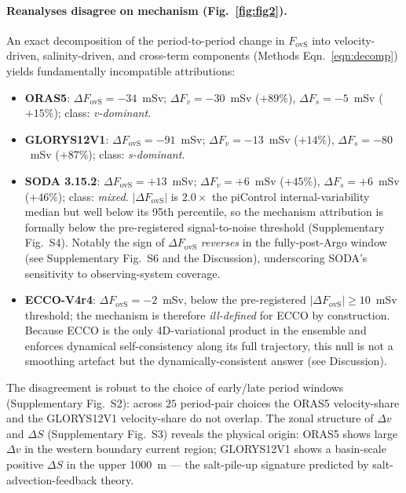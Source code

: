 \documentclass[12pt,a4paper]{article}
\newcommand{\Fovs}{F_\mathrm{ovS}}
\newcommand{\dFv}{\Delta F_v}
\newcommand{\dFs}{\Delta F_s}
\begin{document}
\paragraph{Reanalyses disagree on mechanism (Fig.~\ref{fig:fig2}).}
An exact decomposition of the period-to-period change in $\Fovs$ into
velocity-driven, salinity-driven, and cross-term components
(Methods Eqn.~\ref{eqn:decomp}) yields fundamentally incompatible
attributions:
\begin{itemize}
\item \textbf{ORAS5}: $\Delta\Fovs = -34$~mSv; $\dFv = -30$~mSv
      (${+89\%}$), $\dFs = -5$~mSv (${+15\%}$); class:
      \emph{v-dominant}.
\item \textbf{GLORYS12V1}: $\Delta\Fovs = -91$~mSv; $\dFv = -13$~mSv
      (${+14\%}$), $\dFs = -80$~mSv (${+87\%}$); class:
      \emph{s-dominant}.
\item \textbf{SODA 3.15.2}: $\Delta\Fovs = +13$~mSv;
      $\dFv = +6$~mSv (${+45\%}$), $\dFs = +6$~mSv (${+46\%}$);
      class: \emph{mixed}. $|\Delta\Fovs|$ is $2.0\times$ the
      piControl internal-variability median but well below its 95th
      percentile, so the mechanism attribution is formally below
      the pre-registered signal-to-noise threshold
      (Supplementary Fig.~S4). Notably the sign of $\Delta\Fovs$
      \emph{reverses} in the fully-post-Argo window (see
      Supplementary Fig.~S6 and the Discussion), underscoring
      SODA's sensitivity to observing-system coverage.
\item \textbf{ECCO-V4r4}: $\Delta\Fovs = -2$~mSv, below the
      pre-registered $|\Delta\Fovs| \ge 10$~mSv threshold; the
      mechanism is therefore \emph{ill-defined} for ECCO by
      construction. Because ECCO is the only 4D-variational product
      in the ensemble and enforces dynamical self-consistency along
      its full trajectory, this null is not a smoothing artefact
      but the dynamically-consistent answer (see Discussion).
\end{itemize}
The disagreement is robust to the choice of early/late period windows
(Supplementary Fig.~S2): across $25$ period-pair choices the ORAS5
velocity-share and the GLORYS12V1 velocity-share do not overlap. The zonal
structure of $\Delta v$ and $\Delta S$ (Supplementary Fig.~S3) reveals
the physical origin: ORAS5 shows large $\Delta v$ in the western
boundary current region; GLORYS12V1 shows a basin-scale positive
$\Delta S$ in the upper 1000~m --- the salt-pile-up signature predicted
by salt-advection-feedback theory.
\end{document}
